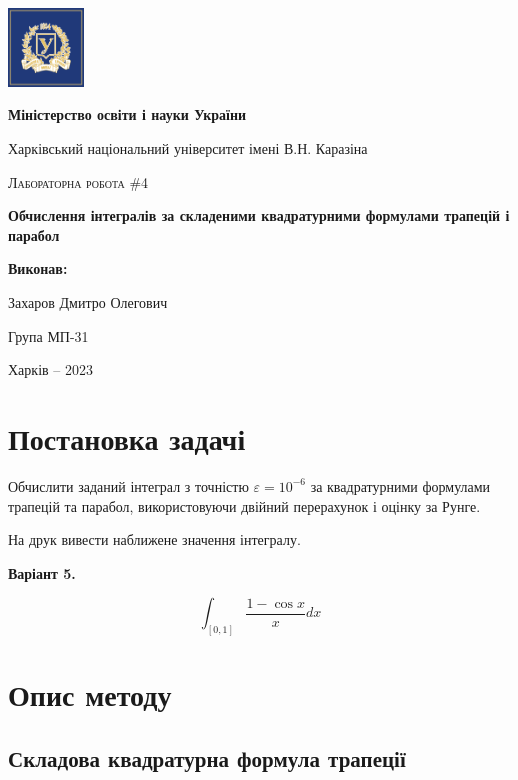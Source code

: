 \documentclass[12pt]{extarticle}
\begin{document}
\begin{titlepage}
	\centering
	\includegraphics[width=0.15\textwidth]{images/lab_1/logo.png}\par\vspace{0.3cm}
	{\textbf{Міністерство освіти і науки України}\par
 Харківський національний університет імені В.Н. Каразіна\par}
    \vspace{1cm}
	{\Large \textsc{Лабораторна робота \#4}\par
    \textbf{Обчислення інтегралів за складеними квадратурними формулами трапецій і парабол}\par}
	\vfill
 \begin{FlushRight}
	\textbf{Виконав:}\par Захаров Дмитро Олегович \par Група МП-31
\end{FlushRight}
	\vfill

	{\large Харків -- 2023\par}
\end{titlepage}

\tableofcontents
\pagebreak

\section{Постановка задачі}

Обчислити заданий інтеграл з точністю $\varepsilon=10^{-6}$ за квадратурними формулами трапецій та парабол, використовуючи двійний перерахунок і оцінку за Рунге. 

На друк вивести наближене значення інтегралу.

\begin{center}
\textbf{Варіант 5.} 
\end{center}

\[
\int_{[0,1]} \frac{1 - \cos x}{x}dx
\]

\pagebreak
\section{Опис методу}

\subsection{Складова квадратурна формула трапеції}\label{section:quadratic_formula}
\end{document}

